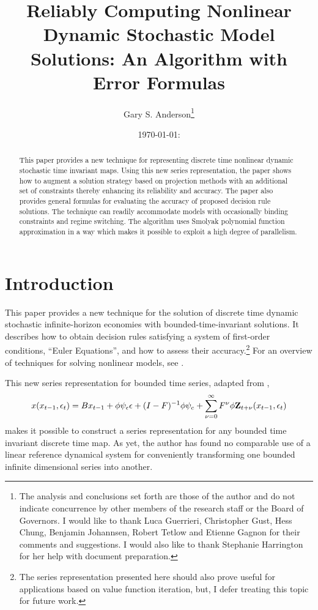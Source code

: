 \documentclass[12pt]{article}
\author{Gary S. Anderson\thanks{The analysis and conclusions set forth are those of the author and do not indicate concurrence by other members of the research staff or the Board of Governors. I would like to thank Luca Guerrieri, Christopher Gust, Hess Chung, Benjamin Johannsen, Robert Tetlow and Etienne Gagnon for their comments and suggestions.  I would also like to thank Stephanie Harrington for her help with document preparation.
}}
\title{Reliably Computing
  Nonlinear Dynamic Stochastic Model Solutions: 
An Algorithm with Error Formulas } %
\date{\today: \currenttime}
\begin{document}



\maketitle

\begin{abstract}
This paper provides a new technique for representing  discrete time  nonlinear dynamic stochastic time invariant maps.
Using this new series representation, the paper shows how to
augment a solution strategy based on projection methods
  with an additional set of
constraints thereby enhancing its reliability and accuracy.
The paper also provides general
formulas for evaluating the accuracy of proposed decision rule solutions.
The technique can readily accommodate models with occasionally binding constraints and regime switching. 
The  algorithm  uses
Smolyak polynomial function approximation  in a way which makes it possible to exploit a high degree of parallelism.







\end{abstract}

\newpage
\tableofcontents
\newpage

\section{Introduction}

This paper provides a new technique for
 the solution of discrete time  dynamic stochastic
infinite-horizon economies with bounded-time-invariant solutions.
It describes how to obtain decision rules satisfying a system of 
first-order conditions, ``Euler Equations'',  and how to assess their accuracy.\footnote{The series 
representation presented here should also prove useful for applications based on
value function iteration, but, I  defer treating this topic for
 future work.
}
 For an overview of techniques for solving nonlinear models,
see \citep{judd92,Christiano2000,doraszelskiy04,gaspar97,Judd2014,marcet.lorenzoni99,juddGSSA2011,maliarmovingbounds,RePEc:bny:wpaper:0058,JuddIntegrals}.


This new series representation for bounded time series, adapted from \citep{anderson10},
\begin{gather*}
      	 x\tArg =B x_{t-1}+ \phi \psi_\epsilon\epsilon + (I - F)^{-1} \phi \psi_c + \sum_{\sForSum=0}^\infty F^\sForSum \phi \ZWOarg_{t+\nu}\tArg%
    \end{gather*}
 makes it possible to  construct a series
    representation for any bounded time invariant discrete time map. As yet, the author has found no comparable use of a
linear reference dynamical system for  conveniently transforming
one bounded infinite dimensional series into another.
\end{document}
